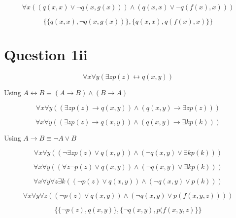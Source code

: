 \documentclass[10pt,a4paper]{article}
\begin{document}
\begin{equation}
 \forall x (( q(x,x) \vee \neg q(x,g(x)))\wedge (q(x,x) \vee \neg q(f(x),x)))
\end{equation}


\begin{equation}
 \{\{q(x,x),\neg q(x,g(x))\},\{q(x,x),q(f(x),x)\}\}
\end{equation}



\section{Question 1ii}


\begin{equation}
 \forall x \forall y(\exists z p(z) \leftrightarrow q(x,y))
\end{equation}

Using $A\leftrightarrow B \equiv (A\rightarrow B)\wedge (B\rightarrow A)$

\begin{equation}
 \forall x \forall y((\exists z p(z) \rightarrow q(x,y))\wedge(q(x,y)\rightarrow \exists z p(z)))
\end{equation}

\begin{equation}
 \forall x \forall y((\exists z p(z) \rightarrow q(x,y))\wedge(q(x,y)\rightarrow \exists k p(k)))
\end{equation}


Using $A\rightarrow B \equiv \neg A \vee B$


\begin{equation}
 \forall x \forall y((\neg\exists z p(z) \vee q(x,y))\wedge(\neg q(x,y) \vee \exists k p(k)))
\end{equation}

\begin{equation}
 \forall x \forall y(( \forall z \neg p(z) \vee q(x,y))\wedge(\neg q(x,y) \vee \exists k p(k)))
\end{equation}

\begin{equation}
 \forall x \forall y \forall z \exists k(( \neg p(z) \vee q(x,y))\wedge(\neg q(x,y) \vee p(k)))
\end{equation}

\begin{equation}
 \forall x \forall y \forall z (( \neg p(z) \vee q(x,y))\wedge(\neg q(x,y) \vee p(f(x,y,z))))
\end{equation}


\begin{equation}
 \{\{\neg p(z),q(x,y)\},\{\neg q(x,y),p(f(x,y,z)\}\}
\end{equation}
\end{document}

